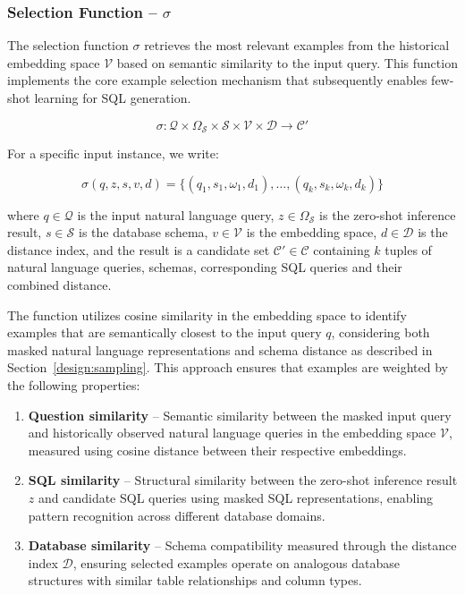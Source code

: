 \subsubsection{Selection Function – $\sigma$}\label{design:selection-function}

The selection function $\sigma$ retrieves the most relevant examples from the
historical embedding space $\mathcal{V}$ based on semantic similarity to the
input query. This function implements the core example selection mechanism 
that subsequently enables few-shot learning for SQL generation.

$$
\sigma: \mathcal{Q} \times \Omega_{\mathcal{S}} \times \mathcal{S} \times \mathcal{V} \times \mathcal{D} \rightarrow \mathcal{C}'
$$

\vspace{0.5em}

For a specific input instance, we write:

$$
\sigma(q, z, s, v, d) = \{(q_1, s_1, \omega_1, d_1), \ldots, (q_k, s_k, \omega_k, d_k)\}
$$

\vspace{0.5em}

where $q \in \mathcal{Q}$ is the input natural language query, $z \in \Omega_{\mathcal{S}}$
is the zero-shot inference result, $s \in \mathcal{S}$ is the database schema,
$v \in \mathcal{V}$ is the embedding space, $d \in \mathcal{D}$ is the distance index,
and the result is a candidate set $\mathcal{C}' \in \mathcal{C}$ containing $k$
tuples of natural language queries, schemas, corresponding SQL queries and their
combined distance.

The function utilizes cosine similarity in the embedding space to identify examples
that are semantically closest to the input query $q$, considering both masked natural
language representations and schema distance as described in Section~\ref{design:sampling}.
This approach ensures that examples are weighted by the following properties:

\begin{enumerate}
    \item \textbf{Question similarity} – Semantic similarity between the masked input
        query and historically observed natural language queries in the embedding space
        $\mathcal{V}$, measured using cosine distance between their respective embeddings.
    \item \textbf{SQL similarity} – Structural similarity between the zero-shot inference
        result $z$ and candidate SQL queries using masked SQL representations, enabling
        pattern recognition across different database domains.
    \item \textbf{Database similarity} – Schema compatibility measured through the distance
        index $\mathcal{D}$, ensuring selected examples operate on analogous database
        structures with similar table relationships and column types.
\end{enumerate}

